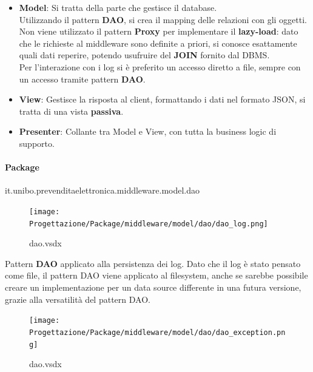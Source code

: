 \documentclass[a4paper]{article}
\begin{document}
\begin{itemize}
    \item \textbf{Model}: Si tratta della parte che gestisce il database.\\Utilizzando il pattern \textbf{DAO}, si crea il mapping delle relazioni con gli oggetti.\\Non viene utilizzato il pattern \textbf{Proxy} per implementare il \textbf{lazy-load}: dato che le richieste al middleware sono definite a priori, si conosce esattamente quali dati reperire, potendo usufruire del \textbf{JOIN} fornito dal DBMS.\\Per l'interazione con i log si è preferito un accesso diretto a file, sempre con un accesso tramite pattern \textbf{DAO}.
    \item \textbf{View}: Gestisce la risposta al client, formattando i dati nel formato JSON, si tratta di una vista \textbf{passiva}.
    \item \textbf{Presenter}: Collante tra Model e View, con tutta la business logic di supporto.
\end{itemize}

\paragraph{Package} it.unibo.prevenditaelettronica.middleware.model.dao




\begin{figure}[H]
    \texttt{[image: Progettazione/Package/middleware/model/dao/dao\_log.png]}
    \centering
    \caption{dao.vsdx}
\end{figure}

Pattern \textbf{DAO} applicato alla persistenza dei log. Dato che il log è stato pensato come file, il pattern DAO viene applicato al filesystem, anche se sarebbe possibile creare un implementazione per un data source differente in una futura versione, grazie alla versatilità del pattern DAO.

\begin{figure}[H]
    \texttt{[image: Progettazione/Package/middleware/model/dao/dao\_exception.png]}
    \centering
    \caption{dao.vsdx}
\end{figure}
\end{document}

